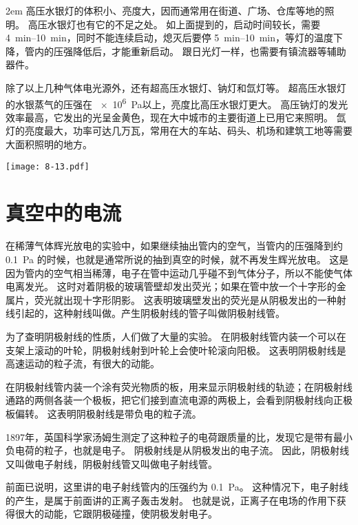 \medskip\noindent
\begin{minipage}{0.7\linewidth}\parindent2em
高压水银灯的体积小、亮度大，因而通常用在街道、广场、仓库等地的照明。
高压水银灯也有它的不足之处。
如上面提到的，启动时间较长，需要 \qtyrange{4}{10}{min}，同时不能连续启动，熄灭后要停 \qtyrange{5}{10}{min}，等灯的温度下降，管内的压强降低后，才能重新启动。
跟日光灯一样，也需要有镇流器等辅助器件。

除了以上几种气体电光源外，还有超高压水银灯、钠灯和氙灯等。
超高压水银灯的水银蒸气的压强在 \qty{e6}{Pa}以上，亮度比高压水银灯更大。
高压钠灯的发光效率最高，它发出的光呈金黄色，现在大中城市的主要街道上已用它来照明。
氙灯的亮度最大，功率可达几万瓦，常用在大的车站、码头、机场和建筑工地等需要大面积照明的地方。
\end{minipage}\hfill
\begin{minipage}{0.27\linewidth}\centering
\begin{figurehere}
  \texttt{[image: 8-13.pdf]}
  \caption{}\label{fig:8-13}
\end{figurehere}
\end{minipage}\par\medskip

\section{真空中的电流}
在稀薄气体辉光放电的实验中，如果继续抽出管内的空气，当管内的压强降到约 \qty{0.1}{Pa} 的时候，也就是通常所说的抽到真空的时候，就不再发生辉光放电。
这是因为管内的空气相当稀薄，电子在管中运动几乎碰不到气体分子，所以不能使气体电离发光。
这时对着阴极的玻璃管壁却发出荧光；如果在管中放一个十字形的金属片，荧光就出现十字形阴影。
这表明玻璃壁发出的荧光是从阴极发出的一种射线引起的，这种射线叫做。产生阴极射线的管子叫做阴极射线管。

为了查明阴极射线的性质，人们做了大量的实验。
在阴极射线管内装一个可以在支架上滚动的叶轮，阴极射线射到叶轮上会使叶轮滚向阳极。
这表明阴极射线是高速运动的粒子流，有很大的动能。

在阴极射线管内装一个涂有荧光物质的板，用来显示阴极射线的轨迹；在阴极射线通路的两侧各装一个极板，把它们接到直流电源的两极上，会看到阴极射线向正极板偏转。
这表明阴极射线是带负电的粒子流。

1897年，英国科学家汤姆生测定了这种粒子的电荷跟质量的比，发现它是带有最小负电荷的粒子，也就是电子。
阴极射线是从阴极发出的电子流。
因此，阴极射线又叫做电子射线，阴极射线管又叫做电子射线管。

前面已说明，这里讲的电子射线管内的压强约为 \qty{0.1}{Pa}。
这种情况下，电子射线的产生，是属于前面讲的正离子轰击发射。
也就是说，正离子在电场的作用下获得很大的动能，它跟阴极碰撞，使阴极发射电子。


